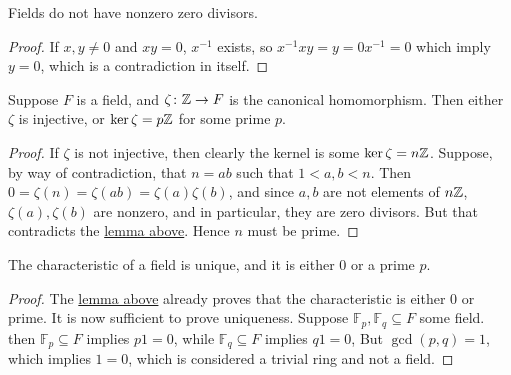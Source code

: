 \begin{lemma}\label{lem:field-no-zero-divisors}
    Fields do not have nonzero zero divisors.
\end{lemma}
\begin{proof}
    If \(x,y \neq 0\) and \(xy = 0\),
    \(x^{-1}\) exists, so \(x^{-1}xy = y = 0x^{-1} = 0\)
    which imply \(y = 0\), which is a contradiction in itself.
\end{proof}
\begin{lemma}\label{lem:field-prime-kernel}
    Suppose \(F\) is a field,
    and \(\zeta\colon\mathbb{Z}\to F\) is the canonical homomorphism.
    Then either \(\zeta\) is injective,
    or \(\ker\zeta = p\mathbb{Z}\) for some prime \(p\).
\end{lemma}
\begin{proof}
    If \(\zeta\) is not injective,
    then clearly the kernel is some \(\ker\zeta = n\mathbb{Z}\).
    Suppose, by way of contradiction, that \(n = ab\) such that \(1 < a,b < n\).
    Then \(0 = \zeta(n) = \zeta(ab) = \zeta(a)\zeta(b)\),
    and since \(a,b\) are not elements of \(n\mathbb{Z}\),
    \(\zeta(a),\zeta(b)\) are nonzero,
    and in particular, they are zero divisors.
    But that contradicts the \hyperref[lem:field-no-zero-divisors]{lemma above}.
    Hence \(n\) must be prime.
\end{proof}
\begin{theorem}\label{thm:field-unique-prime-char}
    The characteristic of a field is unique,
    and it is either 0 or a prime \(p\).
\end{theorem}
\begin{proof}
    The \hyperref[lem:field-prime-kernel]{lemma above}
    already proves that the characteristic is either 0 or prime.
    It is now sufficient to prove uniqueness.
    Suppose \(\mathbb{F}_p, \mathbb{F}_q \subseteq F\) some field.
    then \(\mathbb{F}_p \subseteq F\) implies \(p1 = 0\),
    while \(\mathbb{F}_q \subseteq F\) implies \(q1 = 0\),
    But \(\gcd(p,q) = 1\), which implies \(1 = 0\),
    which is considered a trivial ring and not a field.
\end{proof}

